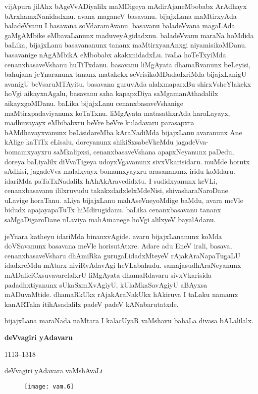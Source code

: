 \documentclass[11pt,a4size]{article}
\begin{document}
vijApura jilAhx bAgeVvADiyalilx maMDigeya mAdirAjaneMbobabx ArAdhayx
bArxhamxNanidadxnu. avana maganeV basavanu. bijajxLana maMtirxyAda
baladeVvanu I basavana soVdaramAvanu. basavanu baladeVvana magaLAda
gaMgAMbike eMbavaLanunx maduveyAgidadxnu. baladeVvanu maraNa hoMdida
baLika, bijajxLanu basavananunx tananx maMtirxyanAnxgi
niyamisikoMDanu. basavanige nAgAMbikA eMbobabx akakxnidadxLu. ivaLa
hoTeTxyiMda cenanxbasaveVshanu huTiTxdanu. basavanu liMgAyata
dhamaRvanunx beLeyisi, bahujana jeYnaranunx tananx matakekx
seVrisikoMDadadxriMda bijajxLanigU avanigU beVsaruMTAyitu. basavana
guruvAda alalxmaparxBu shirxVsheYlakekx hoVgi aikayxnAgalu, basavanu
saha kapapxDiya saMgamanAthadalilx aikayxgoMDanu. baLika bijajxLanu
cenanxbasaveVshanige maMtirxpadaviyanunx koTaTxnu. liMgAyata
matasathxrAda haraLayayx, madhuvayayx eMbibabxru beVre beVre
kuladavaru parasapxra bAMdhavayxvanunx beLisidareMba kAraNadiMda
bijajxLanu avaranunx Ane kAlige kaTiTx eLisalu, doreyanunx
shikiSxsabeVkeMdu jagadeVva-bomamxyayxru saMkalipxsi,
cenanxbasaveVshana apapxNeyanunx paDedu, doreya baLiyalilx diVvaTigeya
udoyxVgavanunx sivxVkarisidaru. muMde hotutx sAdhisi,
jagadeVva-malalxyayx-bomamxyayxru arasananunx iridu koMdaru. idariMda
paTaTxNadalilx hAhAkAravedidxtu. I sudidxyanunx keVLi, cenanxbasavanu
ililxruvudu takakxdadxlelxMdeNisi, shivasharaNaroDane uLavige
horaTanu. aLiya bijajxLanu mahAseVneyoMdige baMdu, avara meVle bidudx
apajayapaTuTx hiMdirugidanu. baLika cenanxbasavanu tananx
saMgaDigaroDane uLaviya mahAmanege hoVgi alilxyeV bayalAdanu.

jeYnara katheyu idariMda binanxvAgide. avaru bijajxLananunx koMda
doVSavanunx basavana meVle horisutAtxre. Adare adu EneV irali, basava,
cenanxbasaveVsharu dhAmiRka gurugaLidadxMteyeV rAjakAraNapaTugaLU
idadxreMdu mAtarx niviRvAdavAgi heVLabahudu. samajasudhAraNeyanunx
mADaliciCxsuvavarelalxrU liMgAyata dhamaRdavaru sivxVkarisida
padadhxtiyanunx sUkaSxmXvAgiyU, kUlaMkaSavAgiyU aBAyxsa
mADuvaMtide. dhamaRkUkx rAjakAraNakUkx hAkiruva I taLaku namamx
kanARTaka itihAsadalilx padeV padeV kANabarutatxde.

bijajxLana maraNada naMtara I kalacUyaR vaMshavu bahaLa divasa
bALalilalx.

\eject
\centerline{\bf deVvagiri yAdavaru}
\centerline{1113--1318}
\medskip

\centerline{deVvagiri yAdavara vaMshAvaLi}
\bigskip
\begin{figure}[H]
\centering
\texttt{[image: vam.6]} 
\end{figure}
\end{document}
